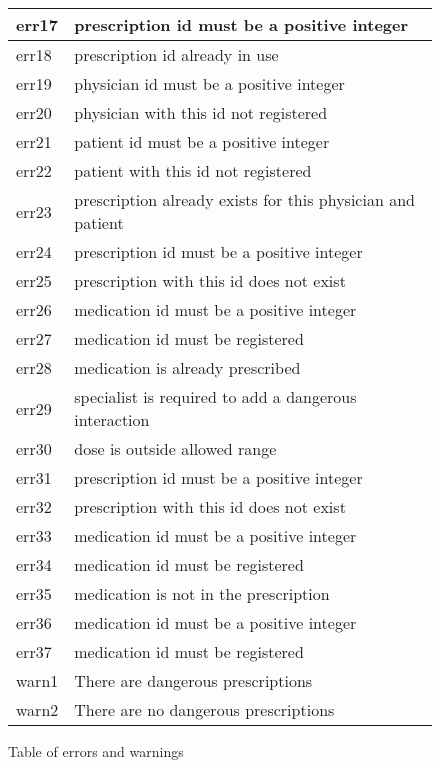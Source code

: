 \begin{figure}[]
\begin{center}
\begin{tabular}{|l|l|}
err17 & prescription id must be a positive integer                 \\ \hline
err18 & prescription id already in use                             \\ \hline
err19 & physician id must be a positive integer                    \\ \hline
err20 & physician with this id not registered                      \\ \hline
err21 & patient id must be a positive integer                      \\ \hline
err22 & patient with this id not registered                        \\ \hline
err23 & prescription already exists for this physician and patient \\ \hline
err24 & prescription id must be a positive integer                 \\ \hline
err25 & prescription with this id does not exist                   \\ \hline
err26 & medication id must be a positive integer                   \\ \hline
err27 & medication id must be registered                           \\ \hline
err28 & medication is already prescribed                           \\ \hline
err29 & specialist is required to add a dangerous interaction      \\ \hline
err30 & dose is outside allowed range                              \\ \hline
err31 & prescription id must be a positive integer                 \\ \hline
err32 & prescription with this id does not exist                   \\ \hline
err33 & medication id must be a positive integer                   \\ \hline
err34 & medication id must be registered                           \\ \hline
err35 & medication is not in the prescription                      \\ \hline
err36 & medication id must be a positive integer                   \\ \hline
err37 & medication id must be registered                           \\ \hline
warn1 & There are dangerous prescriptions                          \\ \hline
warn2 & There are no dangerous prescriptions                       \\ \hline
\end{tabular}
\caption{Table of errors and warnings}
\label{err-table}
\end{center}
\end{figure}

